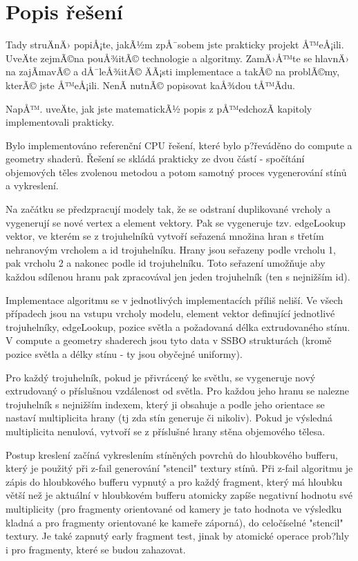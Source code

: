\documentclass[a4paper, 12pt]{article}
\begin{document}
\section{Popis řešení­}

Tady struÄnÄ› popiÅ¡te, jakÃ½m zpÅ¯sobem jste prakticky projekt Å™eÅ¡ili. UveÄte zejmÃ©na pouÅ¾itÃ©
technologie a algoritmy. ZamÄ›Å™te se hlavnÄ› na zajÃ­mavÃ© a dÅ¯leÅ¾itÃ© ÄÃ¡sti implementace a takÃ© na
problÃ©my, kterÃ© jste Å™eÅ¡ili. NenÃ­ nutnÃ© popisovat kaÅ¾dou tÅ™Ã­du.

NapÅ™. uveÄte, jak jste matematickÃ½ popis z pÅ™edchozÃ­ kapitoly implementovali prakticky.


Bylo implementováno referenční CPU řešení, které bylo p?řeváděno do compute a geometry shaderů.
Řešení se skládá prakticky ze dvou částí - spočítání objemových těles zvolenou metodou a potom
samotný proces vygenerování stínů a vykreslení.

Na začátku se předzpracují modely tak, že se odstraní duplikované vrcholy a vygenerují se nové
vertex a element vektory. Pak se vygeneruje tzv. edgeLookup vektor, ve kterém se z trojuhelníků 
vytvoří seřazená množina hran s třetím nehranovým vrcholem a id trojuhelníku. Hrany jsou seřazeny
 podle vrcholu 1, pak vrcholu 2 a nakonec podle id trojuhelníku. Toto seřazení umožňuje aby každou 
sdílenou hranu pak zpracovával jen jeden trojuhelník (ten s nejnižším id).

Implementace algoritmu se v jednotlivých implementacích příliš neliší. Ve všech případech jsou na
vstupu vrcholy modelu, element vektor definující jednotlivé trojuhelníky, edgeLookup, pozice světla a 
požadovaná délka extrudovaného stínu. V compute a geometry shaderech jsou tyto data v SSBO strukturách
(kromě pozice světla a délky stínu - ty jsou obyčejné uniformy).
 
Pro každý trojuhelník, pokud je přivrácený ke světlu, se vygeneruje nový extrudovaný o příslušnou vzdálenost
od světla. Pro každou jeho hranu se nalezne trojuhelník s nejnižším indexem, který ji obsahuje a podle
jeho orientace se nastaví multiplicita hrany (tj zda stín generuje či nikoliv).
Pokud je výsledná multiplicita nenulová, vytvoří se z příslušné hrany stěna objemového tělesa.



Postup kreslení začíná vykreslením stíněných povrchů do hloubkového bufferu, který je použitý při 
z-fail generování "stencil" textury stínů. Při z-fail algoritmu je zápis do hloubkového bufferu vypnutý
a pro každý fragment, který má hloubku větší než je aktuální v hloubkovém bufferu atomicky zapíše negativní
hodnotu své multiplicity (pro fragmenty orientované od kamery je tato hodnota ve výsledku kladná a pro
fragmenty orientované ke kameře záporná), do celočíselné "stencil" textury. Je také zapnutý early fragment test,
jinak by atomické operace prob?hly i pro fragmenty, které se budou zahazovat.
\end{document}
